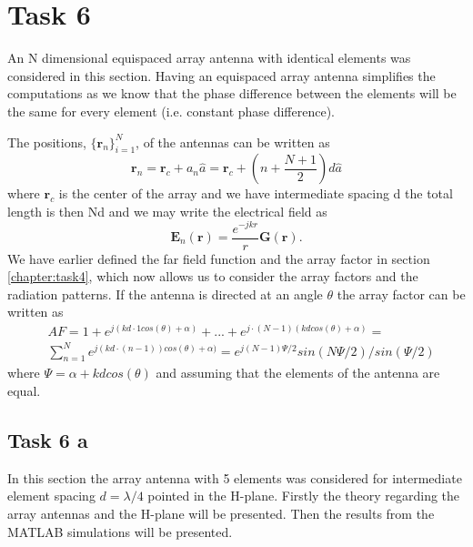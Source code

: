 \chapter{Task 6}
\label{chapter:task6}
An N dimensional equispaced array antenna  with identical elements was considered in this section. Having an equispaced array antenna simplifies the computations as we know that the phase difference between the elements will be the same for every element (i.e. constant phase difference).

The positions, $\{\mathbf{r}_n\}_{i=1}^N$, of the antennas can be written as  
\begin{equation}
\mathbf{r}_n = \mathbf{r}_c + a_n \hat{a} = \mathbf{r}_c + \left (n + \frac{N+1}{2}\right)d\hat{a}
\end{equation}
where $\mathbf{r}_c$ is the center of the array and we have intermediate  spacing d the total length is then Nd and we may write the electrical field as 
\begin{equation}
\mathbf{E}_n(\mathbf{r}) = \frac{e^{-jkr}}{r} \mathbf{G}(\mathbf{r}).
\end{equation}
We have earlier defined the far field function and the array  factor in section \ref{chapter:task4}, which now allows us to consider the array factors and the radiation patterns. If the antenna is directed at an angle $\theta$  the array factor can be written as 
\begin{align}
&AF = 1 + e^{j(kd\cdot 1 cos(\theta) +\alpha)}  + ... + e^{j\cdot(N-1)(kdcos(\theta) +\alpha)} = \\ & \sum_{n=1}^N  e^{j(kd\cdot (n-1)) cos(\theta) +\alpha)} = e^{j(N-1)\Psi/2}sin(N\Psi/2)/ sin(\Psi/2)
\end{align}
where $\Psi = \alpha + kdcos(\theta)$ and assuming that the elements of the antenna are equal.

\section{Task 6 a}
In this section the array antenna with 5 elements was considered for intermediate element spacing $d = \lambda/4$ pointed in the H-plane. Firstly the theory regarding the array antennas and the H-plane will be presented. Then the results from the MATLAB simulations will be presented. 
